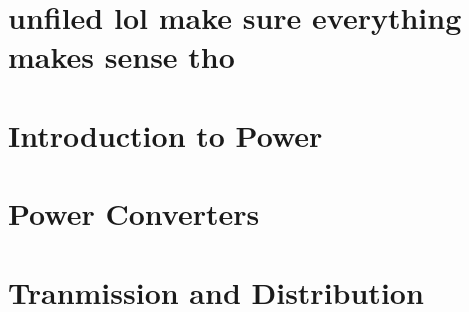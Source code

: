\documentclass{article}
\begin{document}
\tableofcontents
\newpage

\section{unfiled lol make sure everything makes sense tho}


\section{Introduction to Power}



\section{Power Converters}


\section{Tranmission and Distribution}








\newpage
\end{document}
